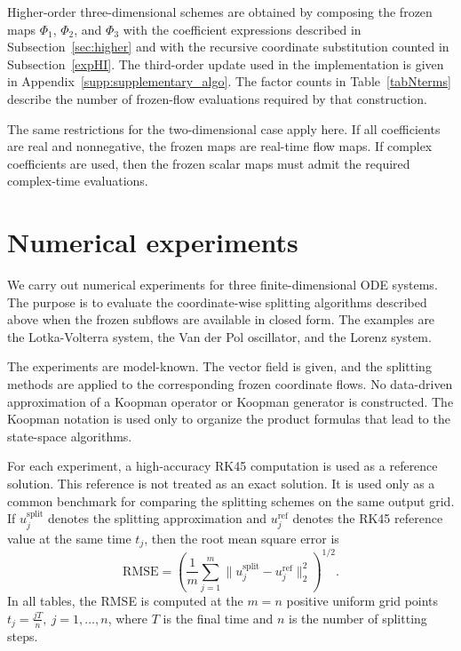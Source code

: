 \documentclass[preprint,1p,times,nopreprintline]{elsarticle}
\begin{document}
Higher-order three-dimensional schemes are obtained by composing the frozen maps $\Phi_1$, $\Phi_2$, and $\Phi_3$ with the coefficient expressions described in Subsection~\ref{sec:higher} and with the recursive coordinate substitution counted in Subsection~\ref{expHI}. The third-order update used in the implementation is given in Appendix~\ref{supp:supplementary_algo}. The factor counts in Table~\ref{tabNterms} describe the number of frozen-flow evaluations required by that construction.

The same restrictions for the two-dimensional case apply here. If all coefficients are real and nonnegative, the frozen maps are real-time flow maps. If complex coefficients are used, then the frozen scalar maps must admit the required complex-time evaluations. 


\section{Numerical experiments}
\label{sec:experiments}

We carry out numerical experiments for three finite-dimensional ODE systems. The purpose is to evaluate the coordinate-wise splitting algorithms described above when the frozen subflows are available in closed form. The examples are the Lotka-Volterra system, the Van der Pol oscillator, and the Lorenz system.

The experiments are model-known. The vector field is given, and the splitting methods are applied to the corresponding frozen coordinate flows. No data-driven approximation of a Koopman operator or Koopman generator is constructed. The Koopman notation is used only to organize the product formulas that lead to the state-space algorithms.

For each experiment, a high-accuracy RK45 computation is used as a reference solution. This reference is not treated as an exact solution. It is used only as a common benchmark for comparing the splitting schemes on the same output grid. If $u_j^{\mathrm{split}}$ denotes the splitting approximation and $u_j^{\mathrm{ref}}$ denotes the RK45 reference value at the same time $t_j$, then the root mean square error is
\[
\mathrm{RMSE}
=
\left(
\frac{1}{m}
\sum_{j=1}^m
\|u_j^{\mathrm{split}}-u_j^{\mathrm{ref}}\|_2^2
\right)^{1/2}.
\]
In all tables, the RMSE is computed at the $m=n$ positive uniform grid points $t_j=\frac{jT}{n},~j=1,\ldots,n$, where $T$ is the final time and $n$ is the number of splitting steps.
\end{document}
